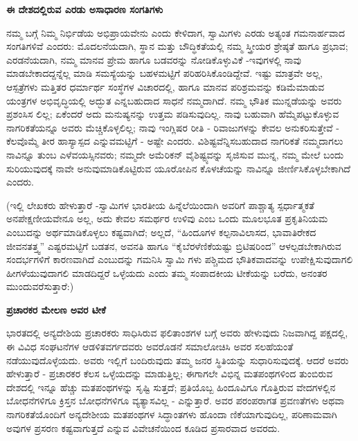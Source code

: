 \begin{center}
\textbf{ಈ ದೇಶದಲ್ಲಿರುವ ಎರಡು ಅಸಾಧಾರಣ ಸಂಗತಿಗಳು}
\end{center}

ನಮ್ಮ ಬಗ್ಗೆ ನಿಮ್ಮ ನಿರ್ಭಿಡೆಯ ಅಭಿಪ್ರಾಯವೇನು ಎಂದು ಕೇಳಿದಾಗ, ಸ್ವಾಮಿಗಳು ಎರಡು ಅತ್ಯಂತ ಗಮನಾರ್ಹವಾದ ಸಂಗತಿಗಳಿವೆ ಎಂದರು: ಮೊದಲನೆಯದಾಗಿ, ಸ್ಥಾನ ಮತ್ತು ಬೌದ್ಧಿಕತೆಯಲ್ಲಿ ನಮ್ಮ ಸ್ತ್ರೀಯರ ಶ್ರೇಷ್ಠತೆ ಹಾಗೂ ಪ್ರಭಾವ; ಎರಡನೆಯದಾಗಿ, ನಮ್ಮ ಮಾನವ ಪ್ರೇಮ ಹಾಗೂ ಬಡವರನ್ನು ನೋಡಿಕೊಳ್ಳುವಿಕೆ -ಇವುಗಳಲ್ಲಿ ನಾವು ಮಾಡಬೇಕಾದದ್ದನ್ನೆಲ್ಲ ಮಾಡಿ ಸಮಸ್ಯೆಯನ್ನು ಬಹಳಮಟ್ಟಿಗೆ ಪರಿಹರಿಸಿಕೊಂಡಿದ್ದೇವೆ. ಇಷ್ಟು ಮಾತ್ರವೇ ಅಲ್ಲ, ಆಸ್ಪತ್ರೆಗಳು ಮತ್ತಿತರ ಧರ್ಮಾರ್ಥ ಸಂಸ್ಥೆಗಳ ವಿಚಾರದಲ್ಲಿ, ಹಾಗೂ ಮಾನವ ಪರಿಶ್ರಮವನ್ನು ಕಡಿಮೆಮಾಡುವ ಯಂತ್ರಗಳ ಅಭಿವೃದ್ಧಿಯಲ್ಲಿ ಅದ್ಭುತ ಎನ್ನಬಹುದಾದ ಸಾಧನೆ ನಮ್ಮದಾಗಿದೆ. ನಮ್ಮ ಭೌತಿಕ ಮುನ್ನಡೆಯನ್ನು ಅವರು ಪ್ರಶಂಸಿಸ ಲಿಲ್ಲ; ಏಕೆಂದರೆ ಅದು ಮನುಷ್ಯನನ್ನು ಉತ್ತಮ ಪಡಿಸುವುದಿಲ್ಲ. ನಾವು ಬಹುವಾಗಿ ಹೆಮ್ಮೆಪಟ್ಟುಕೊಳ್ಳುವ ನಾಗರಿಕತೆಯನ್ನೂ ಅವರು ಮೆಚ್ಚಿಕೊಳ್ಳಲಿಲ್ಲ; ನಾವು ಇಂಗ್ಲಿಷರ ರೀತಿ - ರಿವಾಜುಗಳನ್ನು ಕೇವಲ ಅನುಕರಿಸುತ್ತೇವೆ - ಕೆಲವೊಮ್ಮೆ ತೀರ ಹಾಸ್ಯಾಸ್ಪದ ಎನ್ನುವಮಟ್ಟಿಗೆ - ಅಷ್ಟೇ ಎಂದರು. ವಿಶಿಷ್ಟವೆನ್ನಿಸಬಹುದಾದ ನಾಗರಿಕತೆ ನಮ್ಮದಾಗಲು ನಾವಿನ್ನೂ ತುಂಬ ಎಳೆವಯಸ್ಸಿನವರು; ನಮ್ಮದೇ ಅಮೆರಿಕನ್ ವೈಶಿಷ್ಟ್ಯವನ್ನು ಸೃಜಿಸುವ ಮುನ್ನ, ನಮ್ಮ ಮೇಲೆ ಬಂದು ಸುರಿಯುವುದಕ್ಕೆ ನಾವೇ ಅನುವುಮಾಡಿಕೊಟ್ಟಿರುವ ಯೂರೋಪಿನ ಕೊಳಚೆಯನ್ನು ನಾವಿನ್ನೂ ಜೀರ್ಣಿಸಿಕೊಳ್ಳಬೇಕಾಗಿದೆ ಎಂದರು.

(ಇಲ್ಲಿ ಲೇಖಕರು ಹೇಳುತ್ತಾರೆ -ಸ್ವಾಮಿಗಳ ಭಾರತೀಯ ಹಿನ್ನೆಲೆಯಿಂದಾಗಿ ಅವರಿಗೆ ಪಾಶ್ಚಾತ್ಯ ಸ್ಪರ್ಧಾತ್ಮಕತೆ ಅನಪೇಕ್ಷಣೀಯವೇನೂ ಅಲ್ಲ, ಅದು ಕೇವಲ ಸಮರ್ಥರ ಉಳಿವು ಎಂಬ ಒಂದು ಮೂಲಭೂತ ಪ್ರಕೃತಿನಿಯಮ ಎಂಬುದನ್ನು ಅರ್ಥಮಾಡಿಕೊಳ್ಳಲು ಕಷ್ಟವಾಗಿದೆ; ಅಲ್ಲದೆ, “ಹಿಂದೂಗಳ ಕಲ್ಪನಾವಿಲಾಸದ, ಭಾವಾತಿರೇಕದ ಜೀವನತತ್ತ್ವ” ಎಷ್ಟರಮಟ್ಟಿಗೆ ಬಡತನ, ಅವನತಿ ಹಾಗೂ “ಕೈಬೆರಳೆಣಿಕೆಯಷ್ಟು ಬ್ರಿಟಿಷರಿಂದ” ಆಳಲ್ಪಡಬೇಕಾಗಿರುವ ಸಂದರ್ಭಗಳಿಗೆ ಕಾರಣವಾಗಿದೆ ಎಂಬುದನ್ನು ಗಮನಿಸಿ ಸ್ವಾಮಿ ಗಳು ಪಶ್ಚಿಮದ ಭೌತಿಕವಾದವನ್ನು ಉಪೇಕ್ಷಿಸುವುದಾಗಲಿ ಹೀಗಳೆಯುವುದಾಗಲಿ ಮಾಡದಿದ್ದರೆ ಒಳ್ಳೆಯದು ಎಂದು ತಮ್ಮ ಸಂಪಾದಕೀಯ ಟೀಕೆಯನ್ನು ಬರೆದು, ಅನಂತರ ಮುಂದುವರೆಸುತ್ತಾರೆ:)

\begin{center}
\textbf{ಪ್ರಚಾರಕರ ಮೇಲಣ ಅವರ ಟೀಕೆ}
\end{center}

ಭಾರತದಲ್ಲಿ ಅನ್ಯದೇಶಿಯ ಪ್ರಚಾರಕರು ಸಾಧಿಸಿರುವ ಫಲಿತಾಂಶಗಳ ಬಗ್ಗೆ ಅವರು ಹೇಳುವುದು ನಿಜವಾಗಿದ್ದ ಪಕ್ಷದಲ್ಲಿ, ಈ ವಿವಿಧ ಸಂಘಟನೆಗಳ ಆಡಳಿತವರ್ಗದವರು ಅವರೊಡನೆ ಸಮಾಲೋಚಿಸಿ ಅವರ ಸಲಹೆಯಂತೆ ನಡೆಯುವುದೊಳ್ಳೆಯದು. ಅವರು ಇಲ್ಲಿಗೆ ಬಂದಿರುವುದು ತಮ್ಮ ಜನರ ಸ್ಥಿತಿಯನ್ನು ಸುಧಾರಿಸುವುದಕ್ಕೆ. ಆದರೆ ಅವರು ಹೇಳುತ್ತಾರೆ - ಪ್ರಚಾರಕರ ಕೆಲಸ ಒಳ್ಳೆಯದನ್ನು ಮಾಡುತ್ತಿಲ್ಲ; ಈಗಾಗಲೇ ವಿಭಿನ್ನ ಮತಪಂಥಗಳಿಂದ ತುಂಬಿರುವ ದೇಶದಲ್ಲಿ ಇನ್ನೂ ಹೆಚ್ಚು ಮತಪಂಥಗಳನ್ನು ಸೃಷ್ಟಿ ಸುತ್ತದೆ; ಪ್ರತಿಯೊಬ್ಬ ಹಿಂದೂವಿಗೂ ಗೊತ್ತಿರುವ ವೇದಗಳಲ್ಲಿನ ಬೋಧನೆಗಳಿಗೂ ಕ್ರಿಸ್ತನ ಬೋಧನೆಗಳಿಗೂ ವ್ಯತ್ಯಾಸವಿಲ್ಲ - ಎನ್ನುತ್ತಾರೆ. ಅವರ ಪರಂಪರಾಗತ ಪ್ರವಣತೆಗಳು ಅಥವಾ ನಾಗರಿಕತೆಯೊಂದಿಗೆ ಅನ್ಯದೇಶೀಯ ಮತಪಂಥಗಳ ಸಿದ್ಧಾಂತಗಳು ಹೊಂದಾ ಣಿಕೆಯಾಗುವುದಿಲ್ಲ, ಪರಿಣಾಮವಾಗಿ ಅವುಗಳ ಪ್ರಸರಣ ಕಷ್ಟವಾಗುತ್ತದೆ ಎನ್ನುವ ವಿವೇಚನೆಯಿಂದ ಕೂಡಿದ ಪ್ರಸಾರವಾದ ಅವರದು.

